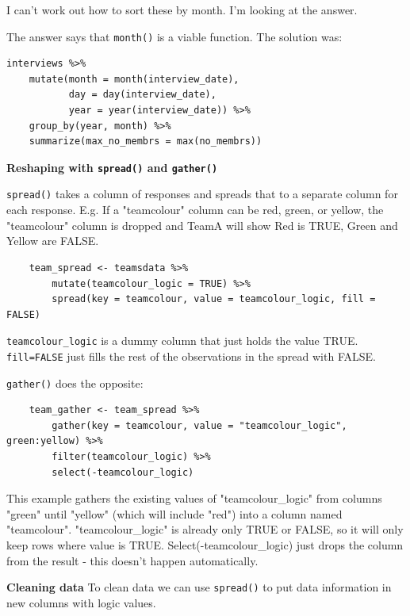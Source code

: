 \documentclass[12pt]{article}
\begin{document}
\begin{addmargin}[1cm]{0cm}
\begin{enumerate}
I can't work out how to sort these by month. I'm looking at the answer. 

The answer says that \texttt{month()} is a viable function. The solution was: \color{gray}\begin{verbatim}
interviews %>%
    mutate(month = month(interview_date),
           day = day(interview_date),
           year = year(interview_date)) %>%
    group_by(year, month) %>%
    summarize(max_no_membrs = max(no_membrs))
\end{verbatim}
\end{enumerate}

\end{addmargin}
\color{black}
\textbf{Reshaping with \texttt{spread()} and \texttt{gather()}}

\texttt{spread()} takes a column of responses and spreads that to a separate column for each response. E.g. If a "teamcolour" column can be red, green, or yellow, the "teamcolour" column is dropped and TeamA will show Red is TRUE, Green and Yellow are FALSE.
\begin{verbatim}
    team_spread <- teamsdata %>%
        mutate(teamcolour_logic = TRUE) %>%
        spread(key = teamcolour, value = teamcolour_logic, fill = FALSE)
\end{verbatim}

\texttt{teamcolour\_logic} is a dummy column that just holds the value TRUE. \texttt{fill=FALSE} just fills the rest of the observations in the spread with FALSE.

\vspace{2em}
\texttt{gather()} does the opposite:
\vspace{-1.5em}\begin{verbatim}
    team_gather <- team_spread %>%
        gather(key = teamcolour, value = "teamcolour_logic", green:yellow) %>%
        filter(teamcolour_logic) %>%
        select(-teamcolour_logic)
\end{verbatim}

This example gathers the existing values of "teamcolour\_logic" from columns "green" until "yellow" (which will include "red") into a column named "teamcolour". "teamcolour\_logic" is already only TRUE or FALSE, so it will only keep rows where value is TRUE. Select(-teamcolour\_logic) just drops the column from the result - this doesn't happen automatically.

\textbf{Cleaning data}
To clean data we can use \texttt{spread()} to put data information in new columns with logic values.
\end{document}

